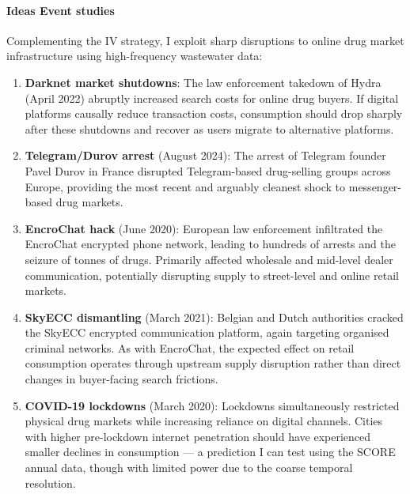 \documentclass[12pt, a4paper]{article}
\begin{document}
\paragraph{Ideas Event studies}
Complementing the IV strategy, I exploit sharp disruptions to 
online drug market infrastructure using high-frequency 
wastewater data:
\begin{enumerate}
    \item \textbf{Darknet market shutdowns}: The law enforcement takedown of Hydra (April 
    2022) abruptly increased search costs for online drug buyers. If digital platforms causally reduce transaction costs, consumption should drop sharply after these shutdowns and recover as users migrate to alternative platforms.
    
    \item \textbf{Telegram/Durov arrest} (August 2024): The 
    arrest of Telegram founder Pavel Durov in France disrupted Telegram-based drug-selling groups across Europe, providing the most recent and arguably cleanest shock to messenger-based drug markets.
    
    \item \textbf{EncroChat hack} (June 2020): European law 
    enforcement infiltrated the EncroChat encrypted phone network, 
    leading to hundreds of arrests and the seizure of tonnes of 
    drugs. Primarily affected wholesale and mid-level dealer 
    communication, potentially disrupting supply to street-level 
    and online retail markets.
    
    \item \textbf{SkyECC dismantling} (March 2021): Belgian and 
    Dutch authorities cracked the SkyECC encrypted communication 
    platform, again targeting organised criminal networks. As with 
    EncroChat, the expected effect on retail consumption operates 
    through upstream supply disruption rather than direct changes 
    in buyer-facing search frictions.
    
    \item \textbf{COVID-19 lockdowns} (March 2020): Lockdowns 
    simultaneously restricted physical drug markets while 
    increasing reliance on digital channels. Cities with higher 
    pre-lockdown internet penetration should have experienced 
    smaller declines in consumption --- a prediction I can test 
    using the SCORE annual data, though with limited power due to 
    the coarse temporal resolution.
\end{enumerate}
\end{document}
